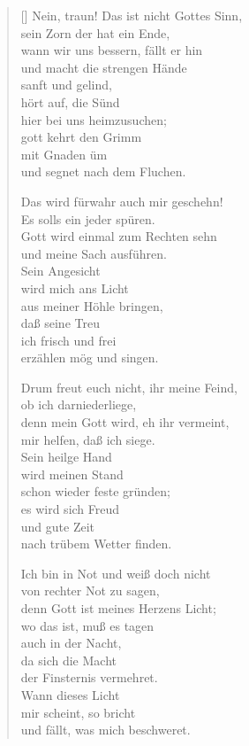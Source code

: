 \begin{multicols}{2}
\begin{verse}[\versewidth]
 Nein, traun! Das ist nicht Gottes Sinn,\\
sein Zorn der hat ein Ende,\\
wann wir uns bessern, fällt er hin\\
und macht die strengen Hände\\
sanft und gelind,\\
hört auf, die Sünd\\
hier bei uns heimzusuchen;\\
gott kehrt den Grimm\\
mit Gnaden üm\\
und segnet nach dem Fluchen.

 Das wird fürwahr auch mir geschehn!\\
Es solls ein jeder spüren.\\
Gott wird einmal zum Rechten sehn\\
und meine Sach ausführen.\\
Sein Angesicht\\
wird mich ans Licht\\
aus meiner Höhle bringen,\\
daß seine Treu\\
ich frisch und frei\\
erzählen mög und singen.

 Drum freut euch nicht, ihr meine Feind,\\
ob ich darniederliege,\\
denn mein Gott wird, eh ihr vermeint,\\
mir helfen, daß ich siege.\\
Sein heilge Hand\\
wird meinen Stand\\
schon wieder feste gründen;\\
es wird sich Freud\\
und gute Zeit\\
nach trübem Wetter finden.

 Ich bin in Not und weiß doch nicht\\
von rechter Not zu sagen,\\
denn Gott ist meines Herzens Licht;\\
wo das ist, muß es tagen\\
auch in der Nacht,\\
da sich die Macht\\
der Finsternis vermehret.\\
Wann dieses Licht\\
mir scheint, so bricht\\
und fällt, was mich beschweret.

\end{verse}
\end{multicols}



